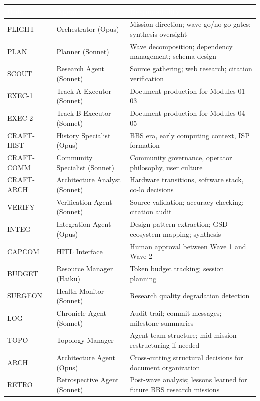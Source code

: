 \documentclass[11pt,letterpaper]{article}
\newcommand{\tableheader}[1]{\textbf{\sffamily\textcolor{white}{#1}}}
\begin{document}
\begin{center}
\begin{tabularx}{\textwidth}{L{2cm}L{3.5cm}X}
\toprule
{}
\tableheader{Role} & \tableheader{Agent} & \tableheader{Responsibility} \\
\midrule
FLIGHT & Orchestrator (Opus) & Mission direction; wave go/no-go gates; synthesis oversight \\
PLAN & Planner (Sonnet) & Wave decomposition; dependency management; schema design \\
SCOUT & Research Agent (Sonnet) & Source gathering; web research; citation verification \\
EXEC-1 & Track A Executor (Sonnet) & Document production for Modules 01--03 \\
EXEC-2 & Track B Executor (Sonnet) & Document production for Modules 04--05 \\
CRAFT-HIST & History Specialist (Opus) & BBS era, early computing context, ISP formation \\
CRAFT-COMM & Community Specialist (Sonnet) & Community governance, operator philosophy, user culture \\
CRAFT-ARCH & Architecture Analyst (Sonnet) & Hardware transitions, software stack, co-lo decisions \\
VERIFY & Verification Agent (Sonnet) & Source validation; accuracy checking; citation audit \\
INTEG & Integration Agent (Opus) & Design pattern extraction; GSD ecosystem mapping; synthesis \\
CAPCOM & HITL Interface & Human approval between Wave 1 and Wave 2 \\
BUDGET & Resource Manager (Haiku) & Token budget tracking; session planning \\
SURGEON & Health Monitor (Sonnet) & Research quality degradation detection \\
LOG & Chronicle Agent (Sonnet) & Audit trail; commit messages; milestone summaries \\
TOPO & Topology Manager & Agent team structure; mid-mission restructuring if needed \\
ARCH & Architecture Agent (Opus) & Cross-cutting structural decisions for document organization \\
RETRO & Retrospective Agent (Sonnet) & Post-wave analysis; lessons learned for future BBS research missions \\
\bottomrule
\end{tabularx}
\end{center}
\end{document}
